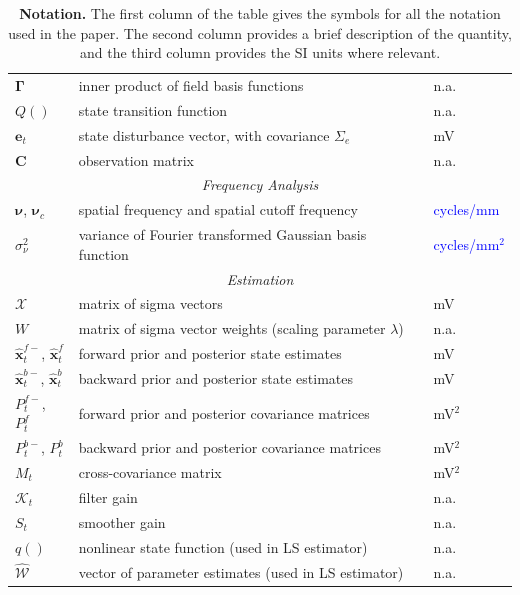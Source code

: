 \documentclass[review,authoryear,3p]{elsarticle}
\newcommand{\parham}[1]{\textcolor{blue}{#1}}
\begin{document}
\begin{table}[!ht]
\begin{tabular}{|l|l|l|}
   	$\boldsymbol{\Gamma}$ & inner product of field basis functions & n.a.\\
   	$Q()$ & state transition function & n.a.\\
   	$\mathbf{e}_t$ & state disturbance vector, with covariance $\Sigma_e$ & mV\\
   	$\mathbf{C}$ & observation matrix & n.a. \\
	\hline
	\multicolumn{3}{|c|}{\emph{Frequency Analysis}} \\
	\hline
	$\boldsymbol{\nu}$, $\boldsymbol{\nu}_c$ & spatial frequency and spatial cutoff frequency & \parham{cycles/mm} \\
	$\sigma_{\nu}^2$ & variance of Fourier transformed Gaussian basis function & \parham{cycles/mm$^2$}\\
	\hline
	\multicolumn{3}{|c|}{\emph{Estimation}} \\
	\hline
	$\mathcal{X}$ & matrix of sigma vectors & mV\\
	$W$ & matrix of sigma vector weights (scaling parameter $\lambda$) & n.a.\\
   	$\hat{\mathbf{x}}_t^{f-}$, $\hat{\mathbf{x}}_t^f$ & forward prior and posterior state estimates & mV\\
   	$\hat{\mathbf{x}}_t^{b-}$, $\hat{\mathbf{x}}_t^{b}$ & backward prior and posterior state estimates & mV\\
 	$P^{f-}_t$, $P^f_t$  & forward prior and posterior covariance matrices & mV$^2$\\
   	$P^{b-}_t$, $P^b_t$ & backward prior and posterior covariance matrices & mV$^2$\\
	$M_t$& cross-covariance matrix & mV$^2$\\
	$\mathcal K_{t} $ & filter gain & n.a.\\
	$S_t$ & smoother gain & n.a.\\
	$q()$ & nonlinear state function (used in LS estimator) & n.a.\\
   	$\mathcal{\hat{W}}$& vector of parameter estimates (used in LS estimator) & n.a.\\	
	\hline
\end{tabular}
\caption{\textbf{Notation.} The first column of the table gives the symbols for all the notation used in the paper. The second column provides a brief description of the quantity, and the third column provides the SI units where relevant.}
\label{tab:Notation}
\end{table}
\clearpage
\newpage
\renewcommand{\arraystretch}{1.7}
\end{document}
